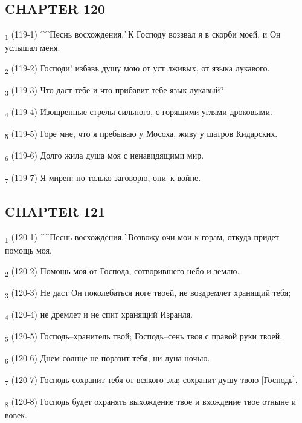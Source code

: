 \subsection{CHAPTER 120}
\begin{tcolorbox}
\textsubscript{1} (119-1) ^^Песнь восхождения.^^ К Господу воззвал я в скорби моей, и Он услышал меня.
\end{tcolorbox}
\begin{tcolorbox}
\textsubscript{2} (119-2) Господи! избавь душу мою от уст лживых, от языка лукавого.
\end{tcolorbox}
\begin{tcolorbox}
\textsubscript{3} (119-3) Что даст тебе и что прибавит тебе язык лукавый?
\end{tcolorbox}
\begin{tcolorbox}
\textsubscript{4} (119-4) Изощренные стрелы сильного, с горящими углями дроковыми.
\end{tcolorbox}
\begin{tcolorbox}
\textsubscript{5} (119-5) Горе мне, что я пребываю у Мосоха, живу у шатров Кидарских.
\end{tcolorbox}
\begin{tcolorbox}
\textsubscript{6} (119-6) Долго жила душа моя с ненавидящими мир.
\end{tcolorbox}
\begin{tcolorbox}
\textsubscript{7} (119-7) Я мирен: но только заговорю, они--к войне.
\end{tcolorbox}
\subsection{CHAPTER 121}
\begin{tcolorbox}
\textsubscript{1} (120-1) ^^Песнь восхождения.^^ Возвожу очи мои к горам, откуда придет помощь моя.
\end{tcolorbox}
\begin{tcolorbox}
\textsubscript{2} (120-2) Помощь моя от Господа, сотворившего небо и землю.
\end{tcolorbox}
\begin{tcolorbox}
\textsubscript{3} (120-3) Не даст Он поколебаться ноге твоей, не воздремлет хранящий тебя;
\end{tcolorbox}
\begin{tcolorbox}
\textsubscript{4} (120-4) не дремлет и не спит хранящий Израиля.
\end{tcolorbox}
\begin{tcolorbox}
\textsubscript{5} (120-5) Господь--хранитель твой; Господь--сень твоя с правой руки твоей.
\end{tcolorbox}
\begin{tcolorbox}
\textsubscript{6} (120-6) Днем солнце не поразит тебя, ни луна ночью.
\end{tcolorbox}
\begin{tcolorbox}
\textsubscript{7} (120-7) Господь сохранит тебя от всякого зла; сохранит душу твою [Господь].
\end{tcolorbox}
\begin{tcolorbox}
\textsubscript{8} (120-8) Господь будет охранять выхождение твое и вхождение твое отныне и вовек.
\end{tcolorbox}
